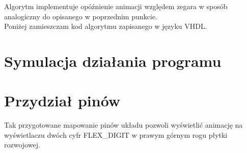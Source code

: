 \documentclass{article}
\begin{document}
        Algorytm implementuje opóźnienie animacji względem zegara w sposób analogiczny do opisanego w poprzednim punkcie.\\ 
    
        Poniżej zamieszczam kod algorytmu zapisanego w języku VHDL. 
        
    
    \section{Symulacja działania programu}
        
    
    \section{Przydział pinów}
        
        Tak przygotowane mapowanie pinów układu pozwoli wyświetlić animację na wyświetlaczu dwóch cyfr FLEX\_DIGIT w prawym górnym rogu płytki rozwojowej. 
    
      
      
      
    
    
\end{document}
